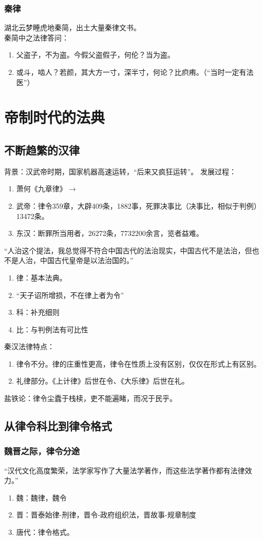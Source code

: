 \documentclass[twoside]{article}
\begin{document}
\subsubsection{秦律}
湖北云梦睡虎地秦简，出土大量秦律文书。\\
秦简中之法律答问：
\begin{enumerate}
	\item 父盗子，不为盗。今假父盗假子，何伦？当为盗。
	\item 或斗，啮人？若颜，其大方一寸，深半寸，何论？比疻痏。（``当时一定有法医''）
\end{enumerate}
\section{帝制时代的法典}
\subsection{不断趋繁的汉律}
背景：汉武帝时期，国家机器高速运转，``后来又疯狂运转''。
发展过程：
\begin{enumerate}
	\item 萧何《九章律》$\rightarrow$
	\item 武帝：律令359章，大辟409条，1882事，死罪决事比（决事比，相似于判例）13472条。
	\item 东汉：断罪所当用者，26272条，7732200余言，览者益难。
\end{enumerate}
``人治这个提法，我总觉得不符合中国古代的法治现实，中国古代不是法治，但也不是人治，中国古代皇帝是以法治国的。''\\
\begin{enumerate}
	\item 律：基本法典。
	\item ``天子诏所增损，不在律上者为令''
	\item 科：补充细则
	\item 比：与判例法有可比性
\end{enumerate}
秦汉法律特点：
\begin{enumerate}
	\item 律令不分。律的庄重性更高，律令在性质上没有区别，仅仅在形式上有区别。
	\item 礼律部分。《上计律》后世在令、《大乐律》后世在礼。
\end{enumerate}
盐铁论：律令尘蠹于栈椟，吏不能遍睹，而况于民乎。
\subsection{从律令科比到律令格式}
\subsubsection{魏晋之际，律令分途}
``汉代文化高度繁荣，法学家写作了大量法学著作，而这些法学著作都有法律效力。''
\begin{enumerate}
	\item 魏：魏律，魏令
	\item 晋：晋泰始律-刑律，晋令-政府组织法，晋故事-规章制度
	\item 唐代：律令格式。
\end{enumerate}
\end{document}

